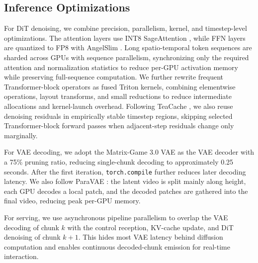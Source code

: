 \subsection{Inference Optimizations}

For DiT denoising, we combine precision, parallelism, kernel, and timestep-level optimizations. The attention layers use INT8 SageAttention \citep{zhang2025sageattention}, while FFN layers are quantized to FP8 with AngelSlim \citep{cen2026angelslim}. Long spatio-temporal token sequences are sharded across GPUs with sequence parallelism, synchronizing only the required attention and normalization statistics to reduce per-GPU activation memory while preserving full-sequence computation. We further rewrite frequent Transformer-block operators as fused Triton kernels, combining elementwise operations, layout transforms, and small reductions to reduce intermediate allocations and kernel-launch overhead. Following TeaCache \citep{liu2025teacache}, we also reuse denoising residuals in empirically stable timestep regions, skipping selected Transformer-block forward passes when adjacent-step residuals change only marginally.

For VAE decoding, we adopt the Matrix-Game 3.0 VAE \citep{wang2026matrixgame} as the VAE decoder with a 75\% pruning ratio, reducing single-chunk decoding to approximately 0.25 seconds. After the first iteration, \texttt{torch.compile} further reduces later decoding latency. We also follow ParaVAE \citep{riseai2026paravae}: the latent video is split mainly along height, each GPU decodes a local patch, and the decoded patches are gathered into the final video, reducing peak per-GPU memory.

For serving, we use asynchronous pipeline parallelism to overlap the VAE decoding of chunk $k$ with the control reception, KV-cache update, and DiT denoising of chunk $k+1$. This hides most VAE latency behind diffusion computation and enables continuous decoded-chunk emission for real-time interaction.

